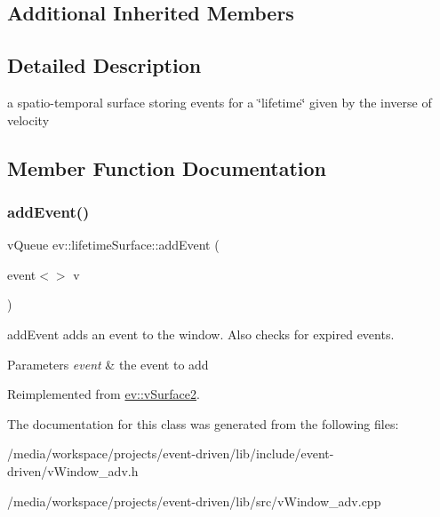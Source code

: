 \subsection*{Additional Inherited Members}


\subsection{Detailed Description}
a spatio-\/temporal surface storing events for a \char`\"{}lifetime\char`\"{} given by the inverse of velocity 

\subsection{Member Function Documentation}
\mbox{\label{classev_1_1lifetimeSurface_a8fce037a13281c0e46c7d660e0ea2275}} 
\subsubsection{\texorpdfstring{add\+Event()}{addEvent()}}
{\footnotesize\ttfamily v\+Queue ev\+::lifetime\+Surface\+::add\+Event (\begin{DoxyParamCaption}\item[{event$<$$>$}]{v }\end{DoxyParamCaption})\hspace{0.3cm}{\ttfamily [virtual]}}



add\+Event adds an event to the window. Also checks for expired events. 


\begin{DoxyParams}{Parameters}
{\em event} & the event to add \\
\hline
\end{DoxyParams}


Reimplemented from \hyperlink{classev_1_1vSurface2_a6dee662976048b73d7b19e45871352da}{ev\+::v\+Surface2}.



The documentation for this class was generated from the following files\+:\begin{DoxyCompactItemize}
\item 
/media/workspace/projects/event-\/driven/lib/include/event-\/driven/v\+Window\+\_\+adv.\+h\item 
/media/workspace/projects/event-\/driven/lib/src/v\+Window\+\_\+adv.\+cpp\end{DoxyCompactItemize}
